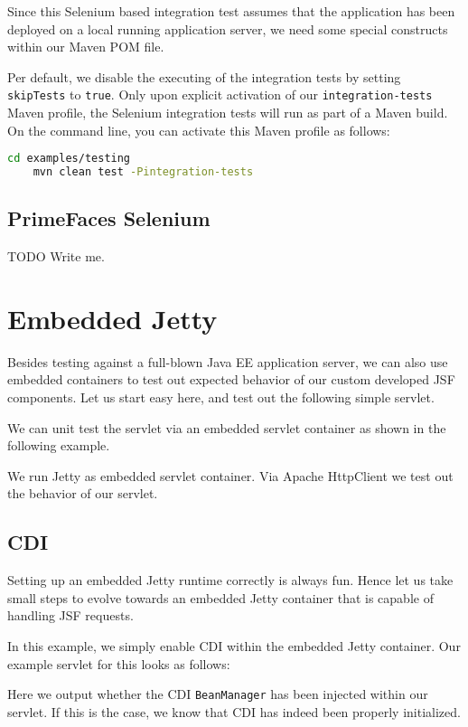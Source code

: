 Since this Selenium based integration test assumes that the application has been deployed on a local running application server, we need some special constructs within our Maven POM file.

Per default, we disable the executing of the integration tests by setting \texttt{skipTests} to \texttt{true}.
Only upon explicit activation of our \texttt{integration-tests} Maven profile,
the Selenium integration tests will run as part of a Maven build.
On the command line, you can activate this Maven profile as follows:
\begin{lstlisting}[language=bash]
	cd examples/testing
	mvn clean test -Pintegration-tests
\end{lstlisting}

\subsection{PrimeFaces Selenium}
\begin{TODO}{TODO}
	Write me.
\end{TODO}

\section{Embedded Jetty}
Besides testing against a full-blown Java EE application server, we can also use embedded containers to test out expected behavior of our custom developed JSF components.
Let us start easy here, and test out the following simple servlet.


We can unit test the servlet via an embedded servlet container as shown in the following example.

We run Jetty \cite{jetty} as embedded servlet container.
Via Apache HttpClient \cite{httpclient} we test out the behavior of our servlet.

\subsection{CDI}
Setting up an embedded Jetty runtime correctly is always fun.
Hence let us take small steps to evolve towards an embedded Jetty container that is capable of handling JSF requests.

In this example, we simply enable CDI within the embedded Jetty container.
Our example servlet for this looks as follows:

Here we output whether the CDI \texttt{BeanManager} has been injected within our servlet.
If this is the case, we know that CDI has indeed been properly initialized.

